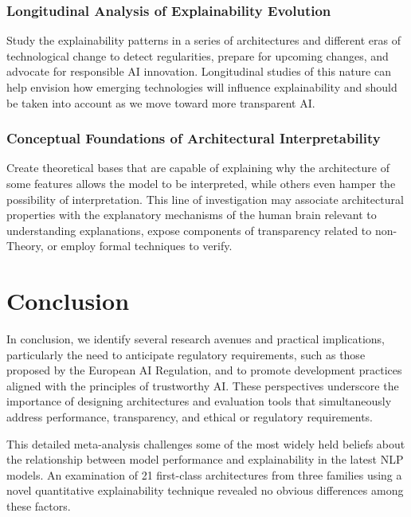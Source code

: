 \documentclass[preprint,12pt]{elsarticle}
\begin{document}
\subsubsection{Longitudinal Analysis of Explainability Evolution}

Study the explainability patterns in a series of architectures and different eras of technological change to detect regularities, prepare for upcoming changes, and advocate for responsible AI innovation. Longitudinal studies of this nature can help envision how emerging technologies will influence explainability and should be taken into account as we move toward more transparent AI.

\subsubsection{Conceptual Foundations of Architectural Interpretability}

Create theoretical bases that are capable of explaining why the architecture of some features allows the model to be interpreted, while others even hamper the possibility of interpretation. This line of investigation may associate architectural properties with the explanatory mechanisms of the human brain relevant to understanding explanations, expose components of transparency related to non-Theory, or employ formal techniques to verify. 

\section{Conclusion}
\label{sec:conclusion}

In conclusion, we identify several research avenues and practical implications, particularly the need to anticipate regulatory requirements, such as those proposed by the European AI Regulation, and to promote development practices aligned with the principles of trustworthy AI. These perspectives underscore the importance of designing architectures and evaluation tools that simultaneously address performance, transparency, and ethical or regulatory requirements.

This detailed meta-analysis challenges some of the most widely held beliefs about the relationship between model performance and explainability in the latest NLP models. An examination of 21 first-class architectures from three families using a novel quantitative explainability technique revealed no obvious differences among these factors.
\end{document}
